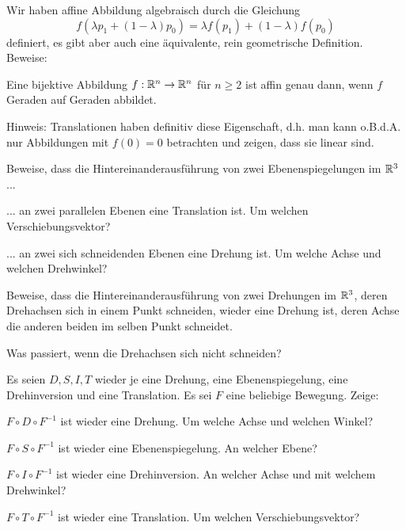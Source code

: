 \begin{sheet}

\begin{problem}[difficulty={Für $n=2$ relativ leicht, für $n=3$ mittelschwer, für $n>3$ mittelschwer bis schwer}]
Wir haben affine Abbildung algebraisch durch die Gleichung
\[f(\lambda p_1 + (1-\lambda)p_0) = \lambda f(p_1)+(1-\lambda)f(p_0)\]
definiert, es gibt aber auch eine äquivalente, rein geometrische Definition. Beweise:

Eine bijektive Abbildung $f:\mathbb{R}^n\to\mathbb{R}^n$ für $n\geq 2$ ist affin genau dann, wenn $f$ Geraden auf Geraden abbildet.

Hinweis: Translationen haben definitiv diese Eigenschaft, d.h. man kann o.B.d.A. nur Abbildungen mit $f(0)=0$ betrachten und zeigen, dass sie linear sind.
\end{problem}

\begin{problem}[title={Komposition von Spiegelungen},difficulty={leicht bis mittel}]
Beweise, dass die Hintereinanderausführung von zwei Ebenenspiegelungen im $\mathbb{R}^3$...
\begin{subproblem}
... an zwei parallelen Ebenen eine Translation ist. Um welchen Verschiebungsvektor?
\end{subproblem}
\begin{subproblem}
... an zwei sich schneidenden Ebenen eine Drehung ist. Um welche Achse und welchen Drehwinkel?
\end{subproblem}
\end{problem}

\begin{problem}[title={Komposition von Drehungen},difficulty={Schwerer als es scheint}]
Beweise, dass die Hintereinanderausführung von zwei Drehungen im $\mathbb{R}^3$, deren Drehachsen sich in einem Punkt schneiden, wieder eine Drehung ist, deren Achse die anderen beiden im selben Punkt schneidet.

Was passiert, wenn die Drehachsen sich nicht schneiden?
\end{problem}

\begin{problem}[title={Konjugation geometrisch}]
Es seien $D,S,I,T$ wieder je eine Drehung, eine Ebenenspiegelung, eine Drehinversion und eine Translation. Es sei $F$ eine beliebige Bewegung. Zeige:
\begin{subproblem}
$F\circ D\circ F^{-1}$ ist wieder eine Drehung. Um welche Achse und welchen Winkel?
\end{subproblem}
\begin{subproblem}
$F\circ S\circ F^{-1}$ ist wieder eine Ebenenspiegelung. An welcher Ebene?
\end{subproblem}
\begin{subproblem}
$F\circ I\circ F^{-1}$ ist wieder eine Drehinversion. An welcher Achse und mit welchem Drehwinkel?
\end{subproblem}
\begin{subproblem}
$F\circ T\circ F^{-1}$ ist wieder eine Translation. Um welchen Verschiebungsvektor?
\end{subproblem}
\end{problem}


\end{sheet}